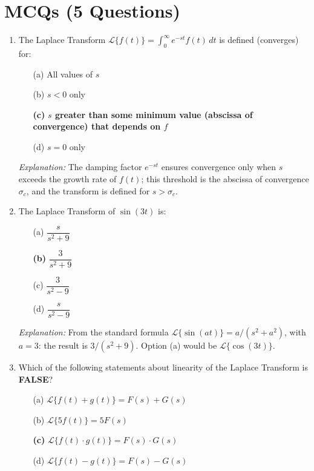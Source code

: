 \documentclass[12pt,a4paper]{article}
\begin{document}
\section{MCQs (5 Questions)}

\begin{enumerate}[leftmargin=1.5em, label=\textbf{MCQ \arabic*.}]

\item The Laplace Transform $\mathcal{L}\{f(t)\} = \int_0^{\infty} e^{-st}f(t)\,dt$ is defined (converges) for:

\begin{itemize}[leftmargin=2em]
  \item[(a)] All values of $s$
  \item[(b)] $s < 0$ only
  \item[\textbf{(c)}] \textbf{$s$ greater than some minimum value (abscissa of convergence) that depends on $f$}
  \item[(d)] $s = 0$ only
\end{itemize}

\textit{Explanation:} The damping factor $e^{-st}$ ensures convergence only when $s$ exceeds the growth rate of $f(t)$; this threshold is the abscissa of convergence $\sigma_c$, and the transform is defined for $s > \sigma_c$.

\item The Laplace Transform of $\sin(3t)$ is:

\begin{itemize}[leftmargin=2em]
  \item[(a)] $\dfrac{s}{s^2+9}$
  \item[\textbf{(b)}] \textbf{$\dfrac{3}{s^2+9}$}
  \item[(c)] $\dfrac{3}{s^2-9}$
  \item[(d)] $\dfrac{s}{s^2-9}$
\end{itemize}

\textit{Explanation:} From the standard formula $\mathcal{L}\{\sin(at)\} = a/(s^2+a^2)$, with $a = 3$: the result is $3/(s^2+9)$. Option (a) would be $\mathcal{L}\{\cos(3t)\}$.

\item Which of the following statements about linearity of the Laplace Transform is \textbf{FALSE}?

\begin{itemize}[leftmargin=2em]
  \item[(a)] $\mathcal{L}\{f(t) + g(t)\} = F(s) + G(s)$
  \item[(b)] $\mathcal{L}\{5f(t)\} = 5F(s)$
  \item[\textbf{(c)}] \textbf{$\mathcal{L}\{f(t)\cdot g(t)\} = F(s)\cdot G(s)$}
  \item[(d)] $\mathcal{L}\{f(t) - g(t)\} = F(s) - G(s)$
\end{itemize}


\end{enumerate}
\end{document}
